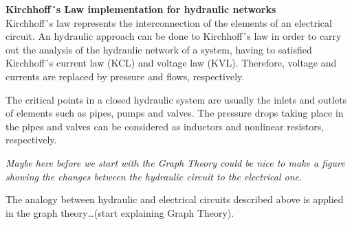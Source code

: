  \textbf{Kirchhoff´s Law implementation for hydraulic networks}\\
 \label{KirchhoffLaw}
 Kirchhoff´s law represents the interconnection of the elements of an electrical circuit. An hydraulic approach 
 can be done to Kirchhoff´s law in order to carry out the analysis of the hydraulic network of a system, having to satisfied Kirchhoff´s 
 current law (KCL) and voltage law (KVL). Therefore, voltage and currents are replaced by pressure and flows, respectively. 

The critical points in a closed hydraulic system are usually the inlets and outlets of elements such as pipes, pumps and valves. 
The pressure drops taking place in the pipes and valves can be considered as inductors and nonlinear resistors, respectively. 

\textit{Maybe here before we start with the Graph Theory could be nice to make a figure showing the changes between the hydraulic circuit to the electrical 
one.}

The analogy between hydraulic and electrical circuits described above is applied in the graph theory…(start explaining Graph Theory).






